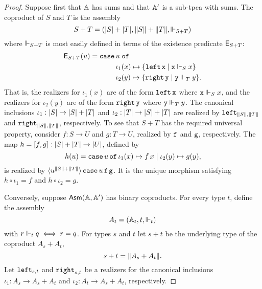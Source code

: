 \begin{proof}
  Suppose first that $\AA$ has sums and that $\subAA$ is a sub-tpca
  with sums. The coproduct of $S$ and $T$ is the assembly
  \begin{equation*}
    S + T = (\S{S} + \S{T}, \T{S} + \T{T}, \rz[S + T])
  \end{equation*}
  where $\rz[S+T]$ is most easily defined in terms of the existence
  predicate $\Ex_{S+T}$:
  \begin{equation*}
    \Ex_{S+T}(u) =
    \xcase{u}
    {\iota_1(x)}{\set{\combLeft\,\R{x} \such \R{x} \rz[S] x}}
    {\iota_2(y)}{\set{\combRight\,\R{y} \such \R{y} \rz[T] y}.}
  \end{equation*}
  That is, the realizers for $\iota_1(x)$ are of the form
  $\combLeft\,\R{x}$ where $\R{x} \rz[S] x$, and the realizers for
  $\iota_2(y)$ are of the form $\combRight\,\R{y}$ where $\R{y} \rz[T]
  y$. The canonical inclusions $\iota_1 : \S{S} \to \S{S} + \S{T}$ and $\iota_2 :
  \S{T} \to \S{S} + \S{T}$ are realized by $\combLeft_{\T{S},\T{T}}$ and
  $\combRight_{\T{S},\T{T}}$, respectively.
  To see that $S + T$ has the required universal property,
  consider $f : S \to U$ and $g : T \to U$,
  realized by $\R{f}$ and $\R{g}$, respectively. The map $h = [f,g] :
  \S{S} + \S{T} \to \S{U}$, defined by
  \begin{equation*}
    h(u) = \case{u}{\iota_1(x)}{f\,x}{\iota_2(y)}{g(y)},
  \end{equation*}
  is realized by
  $\tpcalam{u}{\T{S}+\T{T}}{\combCase\,u\,\R{f}\,\R{g}}$. It is the
  unique morphism satisfying $h \circ \iota_1 = f$ and $h \circ
  \iota_2 = g$.

  Conversely, suppose $\AsmA$ has binary coproducts. For every type
  $t$, define the assembly
  \begin{equation*}
    A_t = (\Atyp{t}, t, {\rz[t]})
  \end{equation*}
  with $r \rz[t] q \iff r = q$. For types $s$ and $t$ let $s+t$ be the
  underlying type of the coproduct $A_s + A_t$,
  \begin{equation*}
    s + t = \T{A_s + A_t}.
  \end{equation*}
  Let $\combLeft_{s,t}$ and $\combRight_{s,t}$ be a realizers for the
  canonical inclusions $\iota_1 : A_s \to A_s + A_t$
  and $\iota_2 : A_t \to A_s + A_t$, respectively.


\end{proof}
